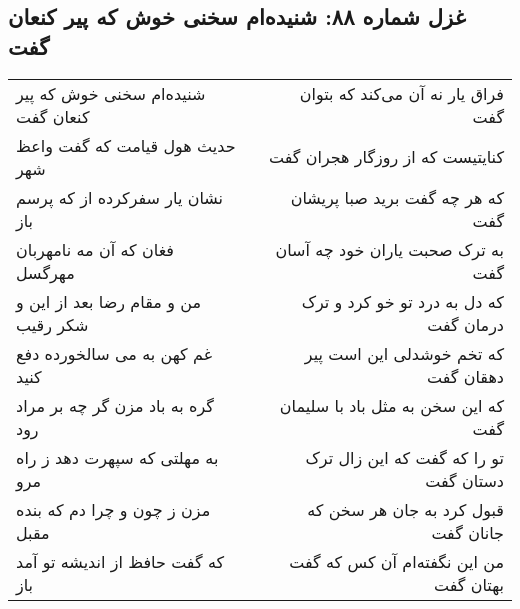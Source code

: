 \begin{center}
\section*{غزل شماره ۸۸: شنیده‌ام سخنی خوش که پیر کنعان گفت}
\label{sec:sh088}
\begin{longtable}{l p{0.5cm} r}
شنیده‌ام سخنی خوش که پیر کنعان گفت
&&
فراق یار نه آن می‌کند که بتوان گفت
\\
حدیث هول قیامت که گفت واعظ شهر
&&
کنایتیست که از روزگار هجران گفت
\\
نشان یار سفرکرده از که پرسم باز
&&
که هر چه گفت برید صبا پریشان گفت
\\
فغان که آن مه نامهربان مهرگسل
&&
به ترک صحبت یاران خود چه آسان گفت
\\
من و مقام رضا بعد از این و شکر رقیب
&&
که دل به درد تو خو کرد و ترک درمان گفت
\\
غم کهن به می سالخورده دفع کنید
&&
که تخم خوشدلی این است پیر دهقان گفت
\\
گره به باد مزن گر چه بر مراد رود
&&
که این سخن به مثل باد با سلیمان گفت
\\
به مهلتی که سپهرت دهد ز راه مرو
&&
تو را که گفت که این زال ترک دستان گفت
\\
مزن ز چون و چرا دم که بنده مقبل
&&
قبول کرد به جان هر سخن که جانان گفت
\\
که گفت حافظ از اندیشه تو آمد باز
&&
من این نگفته‌ام آن کس که گفت بهتان گفت
\\
\end{longtable}
\end{center}
